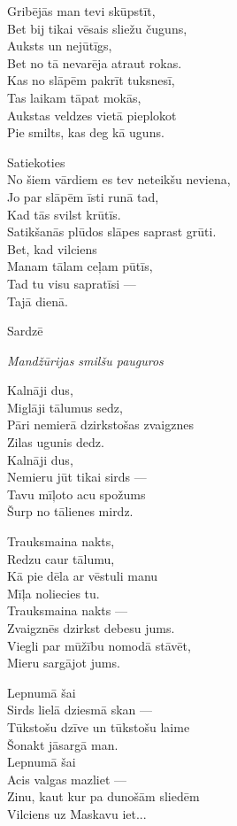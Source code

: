 \documentclass[14pt]{extarticle}
\begin{document}
{{Gribējās man tevi skūpstīt,\\
Bet bij tikai vēsais sliežu čuguns,\\
Auksts un nejūtīgs,\\
Bet no tā nevarēja atraut rokas.\\
Kas no slāpēm pakrīt tuksnesī,\\
Tas laikam tāpat mokās,\\
Aukstas veldzes vietā pieplokot\\
Pie smilts, kas deg kā uguns.

Satiekoties\\
No šiem vārdiem es tev neteikšu neviena,\\
Jo par slāpēm īsti runā tad,\\
Kad tās svilst krūtīs.\\
Satikšanās plūdos slāpes saprast grūti.\\
Bet, kad vilciens\\
Manam tālam ceļam pūtīs,\\
Tad tu visu sapratīsi ---\\
Tajā dienā.

\newpage

{\large \sc Sardzē}

{\em Mandžūrijas smilšu pauguros}

Kalnāji dus,\\
Miglāji tālumus sedz,\\
Pāri nemierā dzirkstošas zvaigznes\\
Zilas ugunis dedz.\\
Kalnāji dus,\\
Nemieru jūt tikai sirds ---\\
Tavu mīļoto acu spožums\\
Šurp no tālienes mirdz.

Trauksmaina nakts,\\
Redzu caur tālumu,\\
Kā pie dēla ar vēstuli manu\\
Mīļa noliecies tu.\\
Trauksmaina nakts ---\\
Zvaigznēs dzirkst debesu jums.\\
Viegli par mūžību nomodā stāvēt,\\
Mieru sargājot jums. 

Lepnumā šai\\
Sirds lielā dziesmā skan ---\\
Tūkstošu dzīve un tūkstošu laime\\
Šonakt jāsargā man.\\
Lepnumā šai\\
Acis valgas mazliet ---\\
Zinu, kaut kur pa dunošām sliedēm\\
Vilciens uz Maskavu iet...

}}
\end{document}
